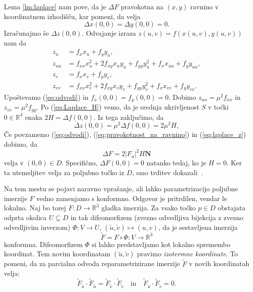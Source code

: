 \documentclass[fin1, tisk, bibtex]{fmfdelo}
\begin{document}
\begin{dokaz}
    Lema \ref{lm:laplace} nam pove, da je $\Delta F$ pravokotna na $(x,y)$ ravnino v koordinatnem izhodišču, kar pomeni, da velja 
    \begin{equation}
        \Delta x(0,0)=\Delta y(0,0)=0. \label{eq:pravokotnost_na_ravnino}
    \end{equation}
    Izračunajmo še $\Delta z(0,0)$. Odvajanje izraza $z(u, v)=f(x(u, v), y(u, v))$ nam da 
    \begin{align*}
        z_u &= f_x x_u + f_y y_u, \\
        z_{uu} &= f_{xx} x_u^2 + 2 f_{xy} x_u y_u + f_{yy} y_u^2 + f_x x_{uu} + f_y y_{uu}, \\[1ex]
        z_v &= f_x x_v + f_y y_v, \\
        z_{vv} &= f_{xx} x_v^2 + 2 f_{xy} x_v y_v + f_{yy} y_v^2 + f_x x_{vv} + f_y y_{vv}.
    \end{align*}
    Upoštevamo (\ref{eq:odvodi}) in $f_x(0,0)=f_y(0,0)=0$. Dobimo $z_{u u}=\mu^2 f_{x x}$ in $z_{v v}=\mu^2 f_{y y}$. Po (\ref{eq:Laplace_H}) vemo, da je srednja ukrivljenost $S$ v točki $0 \in \mathbb{R}^3$ enaka $2H=\Delta f(0,0)$. Iz tega zaključimo, da
    \begin{equation}
        \Delta z(0,0)=\mu^2 \Delta f(0,0)=2\mu^2 H, \label{eq:laplace_z}
    \end{equation}
    Če povzamemo (\ref{eq:odvodi}), (\ref{eq:pravokotnost_na_ravnino}) in (\ref{eq:laplace_z}) dobimo, da
    \begin{equation*}
        \Delta F=2\left|F_u\right|^2 H \mathbf{N}
    \end{equation*}
    velja v $(0,0) \in D$. Specifično, $\Delta F(0,0)=0$ natanko tedaj, ko je $H=0$. Ker ta utemeljitev velja za poljubno točko iz $D$, smo trditev dokazali~\cite[str.8-9]{fosternicmin}. 
\end{dokaz}

Na tem mestu se pojavi naravno vprašanje, ali lahko parametrizacijo poljubne imerzije $F$ vedno zamenjamo s konformno. Odgovor je pritrdilen, vendar le lokalno. Naj bo torej $F: D \rightarrow \mathbb{R}^3$ gladka imerzija. Za vsako točko $p \in D$ obstajata odprta okolica $U \subseteq D$ in tak difeomorfizem (zvezno odvedljiva bijekcija z zvezno odvedljivim inverzom) $\Phi: V \rightarrow U$, $(\tilde{u}, \tilde{v}) \mapsto(u, v)$, da je sestavljena imerzija
\begin{equation*}
    \widetilde{F} = F \circ \Phi : V \rightarrow \mathbb{R}^3
\end{equation*}
konformna. Difeomorfizem $\Phi$ si lahko predstavljamo kot lokalno spremembo koordinat. Tem novim koordinatam $(\tilde{u}, \tilde{v})$ pravimo \emph{izotermne koordinate}. 
To pomeni, da za parcialna odvoda reparametrizirane imerzije $\widetilde{F}$ v novih koordinatah velja:
\begin{equation*}
    \widetilde{F}_{\tilde{u}} \cdot \widetilde{F}_{\tilde{u}}= \widetilde{F}_{\tilde{v}} \cdot \widetilde{F}_{\tilde{v}} \quad \text{in} \quad \widetilde{F}_{\tilde{u}} \cdot \widetilde{F}_{\tilde{v}} = 0.
\end{equation*}
\end{document}
